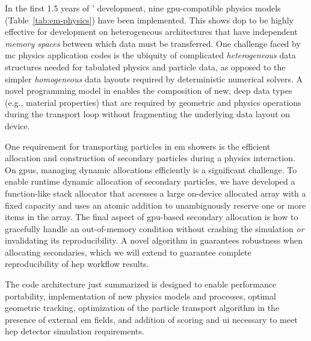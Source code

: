 In the first 1.5 years of \celeritas' development, nine \ac{gpu}-compatible
physics models (Table~\ref{tab:em-physics}) have been implemented. This shows
\ac{dop} to be highly effective for development on heterogeneous architectures
that have independent \emph{memory spaces} between which data must be
transferred. One challenge faced by \ac{mc} physics application codes is the
ubiquity of complicated \emph{heterogeneous} data structures needed for
tabulated physics and particle data, as opposed to the simpler
\emph{homogeneous} data layouts required by deterministic numerical solvers. A
novel programming model in \celeritas enables the composition of new, deep data
types (e.g., material properties) that are required by geometric and physics
operations during the transport loop without fragmenting the underlying data
layout on device.

One requirement for transporting particles in \ac{em} showers is the efficient
allocation and construction of secondary particles during a physics interaction.
On \acp{gpu}, managing dynamic allocations efficiently is a significant
challenge.  To enable runtime dynamic allocation of secondary particles, we have
developed a function-like stack allocator that accesses a large on-device
allocated array with a fixed capacity and uses an atomic addition to
unambiguously reserve one or more items in the array. The final aspect of
\ac{gpu}-based secondary allocation is how to gracefully handle an out-of-memory
condition without crashing the simulation \emph{or} invalidating its
reproducibility. A novel algorithm in \celeritas guarantees robustness when
allocating secondaries, which we will extend to guarantee complete
reproducibility of \ac{hep} workflow results.

The \celeritas code architecture just summarized is designed to enable 
performance portability,  implementation of new physics models and
processes,  optimal geometric tracking,  optimization of the
particle transport algorithm in the presence of external \ac{em} fields, and
 addition of scoring and \ac{ui} necessary to meet \acs{hep} detector
simulation requirements.
